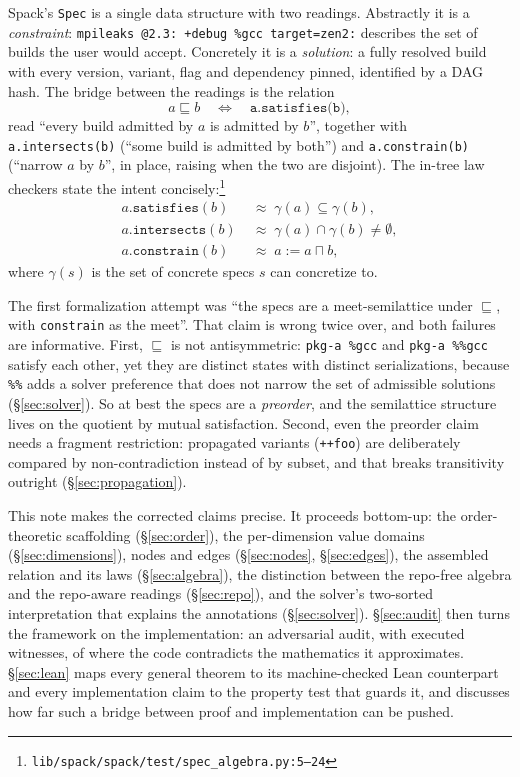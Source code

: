 \documentclass[11pt]{article}
\theoremstyle{definition}
\theoremstyle{remark}
\newcommand{\sat}{\sqsubseteq}
\newcommand{\den}[1]{\gamma(#1)}
\newcommand{\code}[1]{\texttt{#1}}
\newcommand{\src}[1]{\footnote{\code{#1}}}
\begin{document}
Spack's \code{Spec} is a single data structure with two readings.  Abstractly
it is a \emph{constraint}: \code{mpileaks @2.3: +debug \%gcc target=zen2:}
describes the set of builds the user would accept.  Concretely it is a
\emph{solution}: a fully resolved build with every version, variant, flag and
dependency pinned, identified by a DAG hash.  The bridge between the readings
is the relation
\[
  a \sat b \quad\iff\quad \code{a.satisfies(b)},
\]
read ``every build admitted by $a$ is admitted by $b$'', together with
\code{a.intersects(b)} (``some build is admitted by both'') and
\code{a.constrain(b)} (``narrow $a$ by $b$'', in place, raising when the two
are disjoint).  The in-tree law checkers state the intent
concisely:\src{lib/spack/spack/test/spec\_algebra.py:5--24}
\[
\begin{aligned}
  a.\code{satisfies}(b) \;&\approx\; \den{a} \subseteq \den{b},\\
  a.\code{intersects}(b) \;&\approx\; \den{a} \cap \den{b} \neq \emptyset,\\
  a.\code{constrain}(b) \;&\approx\; a \mathrel{:=} a \sqcap b,
\end{aligned}
\]
where $\den{s}$ is the set of concrete specs $s$ can concretize to.

The first formalization attempt was ``the specs are a meet-semilattice under
$\sat$, with \code{constrain} as the meet''.  That claim is wrong twice over,
and both failures are informative.  First, $\sat$ is not antisymmetric:
\code{pkg-a \%gcc} and \code{pkg-a \%\%gcc} satisfy each other, yet they are
distinct states with distinct serializations, because \code{\%\%} adds a solver
preference that does not narrow the set of admissible solutions
(\S\ref{sec:solver}).  So at best the specs are a \emph{preorder}, and the
semilattice structure lives on the quotient by mutual satisfaction.  Second,
even the preorder claim needs a fragment restriction: propagated variants
(\code{++foo}) are deliberately compared by non-contradiction instead of by
subset, and that breaks transitivity outright (\S\ref{sec:propagation}).

This note makes the corrected claims precise.  It proceeds bottom-up: the
order-theoretic scaffolding (\S\ref{sec:order}), the per-dimension value
domains (\S\ref{sec:dimensions}), nodes and edges (\S\ref{sec:nodes},
\S\ref{sec:edges}), the assembled relation and its laws
(\S\ref{sec:algebra}), the distinction between the repo-free algebra and the
repo-aware readings (\S\ref{sec:repo}), and the solver's two-sorted
interpretation that explains the annotations (\S\ref{sec:solver}).
\S\ref{sec:audit} then turns the framework on the implementation: an
adversarial audit, with executed witnesses, of where the code contradicts
the mathematics it approximates.
\S\ref{sec:lean} maps every general theorem to its machine-checked Lean
counterpart and every implementation claim to the property test that guards
it, and discusses how far such a bridge between proof and implementation can
be pushed.
\end{document}
